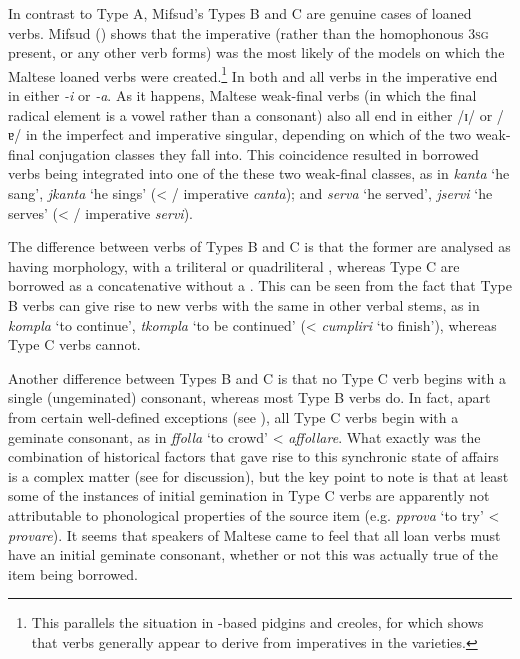 \documentclass[output=paper]{langsci/langscibook}
\begin{document}
In contrast to Type A, Mifsud's Types B and C are genuine cases of loaned verbs. Mifsud (\citeyear[110--116]{mifsudloanverbs}) shows that the imperative (rather than the homophonous 3\textsc{sg} present, or any other verb forms) was the most likely  of the  models on which the Maltese loaned verbs were created.\footnote{This parallels the situation in -based pidgins and creoles, for which \cite{Versteegh2014pidgin} shows that verbs generally appear to derive from imperatives in the  varieties.} In both  and  all verbs in the imperative end in either \textit{-i} or \textit{-a}. As it happens, Maltese weak-final verbs (in which the final radical element is a vowel rather than a consonant) also all end in either /ɪ/ or /ɐ/ in the imperfect and imperative singular, depending on which of the two weak-final conjugation classes they fall into. This coincidence resulted in borrowed  verbs being integrated into one of the these two weak-final classes, as in \textit{kanta} `he sang', \textit{jkanta} `he sings' (< / imperative \textit{canta}); and \textit{serva} `he served', \textit{jservi} `he serves' (< / imperative \textit{servi}).

The difference between verbs of Types B and C is that the former are analysed as having  morphology, with a triliteral or quadriliteral , whereas Type C are borrowed as a concatenative  without a . This can be seen from the fact that Type B verbs can give rise to new verbs with the same  in other verbal stems, as in \textit{kompla} `to continue', \textit{tkompla} `to be continued' (<  \textit{cumpliri} `to finish'), whereas Type C verbs cannot.\largerpage

Another difference between Types B and C is that no Type C verb begins with a single (ungeminated) consonant, whereas most Type B verbs do. In fact, apart from certain well-defined exceptions (see \citealt[152]{mifsudloanverbs}), all Type C verbs begin with a geminate consonant, as in \textit{ffolla} `to crowd' <  \textit{affollare}. What exactly was the combination of historical factors that gave rise to this synchronic state of affairs is a complex matter (see \citealt[158--168]{mifsudloanverbs} for discussion), but the key point to note is that at least some of the instances of initial gemination in Type C verbs are apparently not attributable to phonological properties of the source item (e.g. \textit{pprova} `to try' <  \textit{provare}). It seems that speakers of Maltese came to feel that all loan verbs must have an initial geminate consonant, whether or not this was actually true of the item being borrowed.
\end{document}
